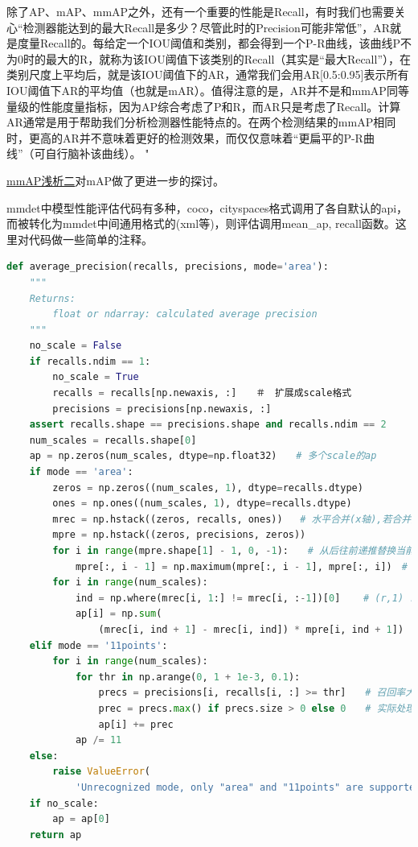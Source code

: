 \documentclass[UTF8]{ctexart}
\begin{document}
除了AP、mAP、mmAP之外，还有一个重要的性能是Recall，有时我们也需要关心“检测器能达到的最大Recall是多少？尽管此时的Precision可能非常低”，AR就是度量Recall的。每给定一个IOU阈值和类别，都会得到一个P-R曲线，该曲线P不为0时的最大的R，就称为该IOU阈值下该类别的Recall（其实是“最大Recall”），在类别尺度上平均后，就是该IOU阈值下的AR，通常我们会用AR[0.5:0.95]表示所有IOU阈值下AR的平均值（也就是mAR）。值得注意的是，AR并不是和mmAP同等量级的性能度量指标，因为AP综合考虑了P和R，而AR只是考虑了Recall。计算AR通常是用于帮助我们分析检测器性能特点的。在两个检测结果的mmAP相同时，更高的AR并不意味着更好的检测效果，而仅仅意味着“更扁平的P-R曲线”（可自行脑补该曲线）。
"

\href{https://zhuanlan.zhihu.com/p/56899189}{mmAP浅析二}对mAP做了更进一步的探讨。


mmdet中模型性能评估代码有多种，coco，cityspaces格式调用了各自默认的api，而被转化为mmdet中间通用格式的(xml等)，则评估调用mean\_ap, recall函数。这里对代码做一些简单的注释。

\lstset{style=mystyle}
\begin{lstlisting}[language=Python]
def average_precision(recalls, precisions, mode='area'):
    """
    Returns:
        float or ndarray: calculated average precision
    """
    no_scale = False
    if recalls.ndim == 1:
        no_scale = True
        recalls = recalls[np.newaxis, :]　　＃　扩展成scale格式
        precisions = precisions[np.newaxis, :]
    assert recalls.shape == precisions.shape and recalls.ndim == 2
    num_scales = recalls.shape[0]
    ap = np.zeros(num_scales, dtype=np.float32)　　# 多个scale的ap
    if mode == 'area':
        zeros = np.zeros((num_scales, 1), dtype=recalls.dtype)
        ones = np.ones((num_scales, 1), dtype=recalls.dtype)
        mrec = np.hstack((zeros, recalls, ones))   # 水平合并(x轴),若合并对象多维,则对应维度水平合并, (num_scales, 3)
        mpre = np.hstack((zeros, precisions, zeros))
        for i in range(mpre.shape[1] - 1, 0, -1):　　# 从后往前递推替换当前值为相邻两向量对应的较大值
            mpre[:, i - 1] = np.maximum(mpre[:, i - 1], mpre[:, i])　# 返回两向量对应位置的较大值
        for i in range(num_scales):
            ind = np.where(mrec[i, 1:] != mrec[i, :-1])[0]    # (r,1) != (0,r)
            ap[i] = np.sum(
                (mrec[i, ind + 1] - mrec[i, ind]) * mpre[i, ind + 1])  # R差*P
    elif mode == '11points':
        for i in range(num_scales):
            for thr in np.arange(0, 1 + 1e-3, 0.1):
                precs = precisions[i, recalls[i, :] >= thr]　　# 召回率大于11等分阈值对应的精度
                prec = precs.max() if precs.size > 0 else 0　　# 实际处理,取精度的极大值(修正后的P-R曲线)
                ap[i] += prec
            ap /= 11
    else:
        raise ValueError(
            'Unrecognized mode, only "area" and "11points" are supported')
    if no_scale:
        ap = ap[0]
    return ap
\end{lstlisting}
\end{document}
